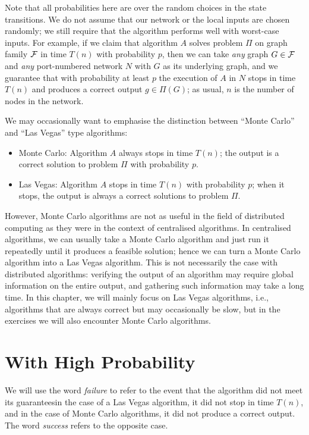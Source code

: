 Note that all probabilities here are over the random choices in the state transitions. We do not assume that our network or the local inputs are chosen randomly; we still require that the algorithm performs well with worst-case inputs. For example, if we claim that algorithm $A$ solves problem $\Pi$ on graph family $\mathcal{F}$ in time $T(n)$ with probability $p$, then we can take \emph{any} graph $G \in \mathcal{F}$ and \emph{any} port-numbered network $N$ with $G$ as its underlying graph, and we guarantee that with probability at least $p$ the execution of $A$ in $N$ stops in time $T(n)$ and produces a correct output $g \in \Pi(G)$; as usual, $n$ is the number of nodes in the network.

We may occasionally want to emphasise the distinction between ``Monte Carlo'' and ``Las Vegas'' type algorithms:
\begin{itemize}
    \item Monte Carlo: Algorithm $A$ always stops in time $T(n)$; the output is a correct solution to problem $\Pi$ with probability $p$.
    \item Las Vegas: Algorithm $A$ stops in time $T(n)$ with probability $p$; when it stops, the output is always a correct solutions to problem $\Pi$.
\end{itemize}
However, Monte Carlo algorithms are not as useful in the field of distributed computing as they were in the context of centralised algorithms. In centralised algorithms, we can usually take a Monte Carlo algorithm and just run it repeatedly until it produces a feasible solution; hence we can turn a Monte Carlo algorithm into a Las Vegas algorithm. This is not necessarily the case with distributed algorithms: verifying the output of an algorithm may require global information on the entire output, and gathering such information may take a long time. In this chapter, we will mainly focus on Las Vegas algorithms, i.e., algorithms that are always correct but may occasionally be slow, but in the exercises we will also encounter Monte Carlo algorithms.


\section{With High Probability}

We will use the word \emph{failure} to refer to the event that the algorithm did not meet its guarantees\mydash in the case of a Las Vegas algorithm, it did not stop in time $T(n)$, and in the case of Monte Carlo algorithms, it did not produce a correct output. The word \emph{success} refers to the opposite case.

